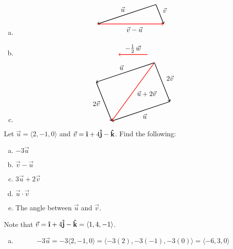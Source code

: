 \documentclass[12pt,letterpaper]{exam}
\newcommand{\uveci}{{\bm{\hat{\textnormal{\bfseries\i}}}}}
\newcommand{\uvecj}{{\bm{\hat{\textnormal{\bfseries j}}}}}
\newcommand{\uveck}{{\bm{\hat{\textnormal{\bfseries k}}}}}
\begin{document}
\begin{questions}
\begin{enumerate}[(a)]
\item 
	\[
	\begin{tikzpicture}
	\node at (-1.7,-0.25) {$\vec{u}$};
	\draw[line width=0.03cm,->] (0,0) -- (-3,-1);
	
	\node at (0.45,-0.3) {$\vec{v}$};
	\draw[line width=0.03cm,->] (0,0) -- (0.4,-1);
	
	\node at (-1.1,-1.3) {$\vec{v} - \vec{u}$};
	\draw[line width=0.03cm,->,red] (-3,-1) -- (0.4,-1);
	\end{tikzpicture}
	\]

\item 
	\[
	\begin{tikzpicture}
	\node at (0.75,0.3) {$-\frac{1}{2}\, \vec{w}$};
	\draw[line width=0.03cm,->,red] (1.5,0) -- (0,0);
	\end{tikzpicture}
	\]

\item 
	\[
	\begin{tikzpicture}
	\node at (-1.7,-0.25) {$\vec{u}$};
	\node at (-3,-2.1) {$2\vec{v}$};
	\draw[line width=0.03cm,->] (0,0) -- (-3,-1);
	\draw[line width=0.03cm,->] (-3,-1) -- (-2.2,-3);

	\node at (0.8,-0.8) {$2\vec{v}$};
	\node at (-0.5,-2.75) {$\vec{u}$};
	\draw[line width=0.03cm,->] (0,0) -- (0.8,-2);
	\draw[line width=0.03cm,->] (0.8,-2) -- (-2.2,-3);
	
	\node at (-0.4,-1.6) {$\vec{u} + 2\vec{v}$};
	\draw[line width=0.03cm,->,red] (0,0) -- (-2.2,-3);
	\end{tikzpicture}
	\]
\end{enumerate}



\newpage
\question[10] Let $\vec{u}= \langle 2, -1, 0 \rangle$ and $\vec{v}= \uveci + 4 \uvecj - \uveck$. Find the following:
	\begin{enumerate}[(a)]
	\item $-3 \vec{u}$
	\item $\vec{v} - \vec{u}$
	\item $3 \vec{u} + 2 \vec{v}$
	\item $\vec{u} \cdot \vec{v}$
	\item The angle between $\vec{u}$ and $\vec{v}$. 
	\end{enumerate} \pspace

\sol Note that $\vec{v}= \uveci + 4 \uvecj - \uveck= \langle 1, 4, -1 \rangle$. 
\begin{enumerate}[(a)]
\item 
	\[
	-3 \vec{u}= -3 \langle 2, -1, 0 \rangle= \langle -3(2), -3(-1), -3(0) \rangle= \langle -6, 3, 0 \rangle 
	\] \pspace


\end{enumerate}
\end{questions}
\end{document}
